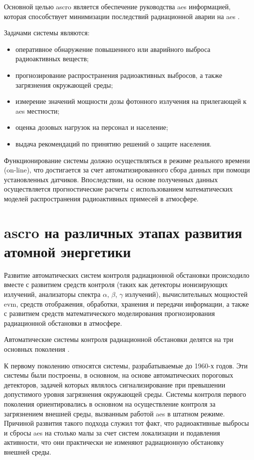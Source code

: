 Основной целью \ac{ascro} является обеспечение руководства \ac{aes} информацией, которая способствует минимизации 
последствий радиационной аварии на \ac{aes} \cite{elokhin}.

Задачами системы являются:

\begin{itemize}
	\item оперативное обнаружение повышенного или аварийного выброса радиоактивных веществ;
	\item прогнозирование распространения радиоактивных выбросов, а также загрязнения окружающей среды;
	\item измерение значений мощности дозы фотонного излучения на прилегающей к \ac{aes} местности;
	\item оценка дозовых нагрузок на персонал и население;
	\item выдача рекомендаций по принятию решений о защите населения.
\end{itemize}

Функционирование системы должно осуществляться в режиме реального времени (on-line), что достигается за счет 
автоматизированного сбора данных при помощи установленных датчиков. Впоследствии, на основе полученных данных 
осуществляется прогностические расчеты с использованием математических моделей распространения радиоактивных примесей в 
атмосфере.

\section{\ac{ascro} на различных этапах развития атомной энергетики}

Развитие автоматических систем контроля радиационной обстановки происходило вместе с развитием средств контроля
(таких как детекторы ионизирующих излучений, анализаторы спектра $\alpha$, $\beta$, $\gamma$ излучений), вычислительных 
мощностей \ac{evm}, средств отображения, обработки, хранения и передачи информации, а также с развитием средств 
математического моделирования прогнозирования радиационной обстановки в атмосфере.

Автоматические системы контроля радиационной обстановки делятся на три основных поколения \cite{elokhin}.

К первому поколению относятся системы, разрабатываемые до 1960-х годов. Эти системы были построены, в основном, на 
основе автоматических пороговых детекторов, задачей которых являлось сигнализирование при превышении допустимого уровня 
загрязнения окружающей среды. Системы контроля первого поколения ориентировались в основном на осуществление контроля 
за загрязнением внешней среды, вызванным работой \ac{aes} в штатном режиме. Причиной развития такого подхода служил тот 
факт, что радиоактивные выбросы и сбросы \ac{aes} на столько малы за счет систем локализации и подавления активности, 
что они практически не изменяют радиационную обстановку внешней среды.

